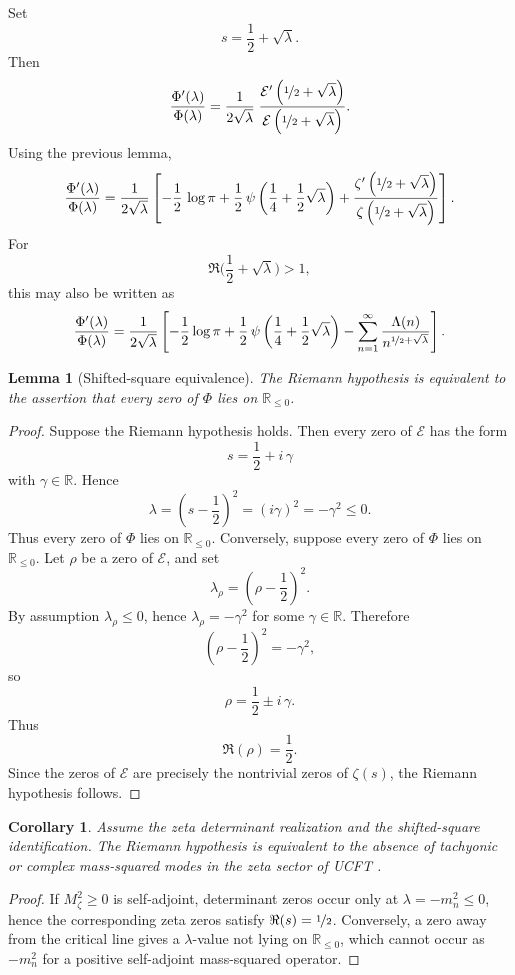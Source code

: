 \documentclass[pdflatex,sn-mathphys-num]{sn-jnl}
\theoremstyle{thmstyleone}
\newtheorem{lemma}{Lemma}
\newtheorem{corollary}{Corollary}
\theoremstyle{thmstyletwo}
\theoremstyle{thmstylethree}
\newcommand{\R}{\mathbb{R}}
\begin{document}
  \noindent Set
  \[
  s=\frac12+\sqrt{\lambda}.
  \]
  Then
  \[
  \frac{\Phi'(\lambda)}{\Phi(\lambda)}
  =
  \frac{1}{2\sqrt{\lambda}}\;
  \frac{\mathcal E'\left(\nicefrac12+\sqrt{\lambda}\right)}
  {\mathcal E\left(\nicefrac12+\sqrt{\lambda}\right)}.
  \]
  Using the previous lemma,
  \[
  \frac{\Phi'(\lambda)}{\Phi(\lambda)}
  =
  \frac{1}{2\sqrt{\lambda}}
  \left[
  -\frac12 \, \log\pi
  +
  \frac12 \, \psi\left(\frac14+\frac12\sqrt{\lambda}\right)
  +
  \frac{\zeta'\left(\nicefrac12+\sqrt{\lambda}\right)}
  {\zeta\left(\nicefrac12+\sqrt{\lambda}\right)}
  \right].
  \]
  For
  \[\Re\bigg(\frac12+\sqrt{\lambda}\bigg)>1,\]
  this may also be written as
  \[
  \frac{\Phi'(\lambda)}{\Phi(\lambda)}
  =
  \frac{1}{2\sqrt{\lambda}}
  \left[
  -\frac12\log\pi
  +
  \frac12 \,
    \psi\left(
      \frac14
      + \frac12\sqrt{\lambda}
    \right)
  -
  \sum_{n=1}^{\infty}
  \frac{
    \Lambda(n)
  }{
    n^{\nicefrac{1}{2}+\sqrt{\lambda}}
  }
  \right].
  \]

  \begin{lemma}[Shifted-square equivalence]
  The Riemann hypothesis \cite{Riemann1859,Edwards1974,Titchmarsh1986} is equivalent to the assertion that every zero of
  $\Phi$ lies on $\mathbb{R}_{\le0}$.
  \end{lemma}

  \begin{proof}
  Suppose the Riemann hypothesis holds.
  Then every zero of \(\mathcal{E}\) has the form
  \[
  s=\frac12+i\, \gamma
  \]
  with \(\gamma\in\mathbb R\). Hence
  \[
  \lambda=\left(s-\frac12\right)^2
  =
  (i\gamma)^2
  =
  -\gamma^2\le0.
  \]
  Thus every zero of \(\Phi\) lies on $\mathbb{R}_{\le0}$.
  Conversely, suppose every zero of \(\Phi\) lies on $\mathbb{R}_{\le0}$.
  Let \(\rho\) be a zero of \(\mathcal{E}\), and set
  \[
  \lambda_\rho=\left(\rho-\frac12\right)^2.
  \]
  By assumption $\lambda_\rho\le0$, hence $\lambda_\rho=-\gamma^2$
  for some \(\gamma\in\mathbb R\). Therefore
  \[
  \left(\rho-\frac12\right)^2=-\gamma^2,
  \]
  so
  \[
  \rho=\frac12\pm i\, \gamma.
  \]
  Thus
  \[
  \Re(\rho)=\frac12.
  \]
  Since the zeros of \(\mathcal{E}\) are precisely the nontrivial zeros of
  \(\zeta(s)\), the Riemann hypothesis follows.
  \end{proof}

  \begin{corollary}
  Assume the zeta determinant realization and the shifted-square identification.
  The Riemann hypothesis is equivalent to the absence of tachyonic or complex
  mass-squared modes in the zeta sector of UCFT \cite{Connes1999,BerryKeating1999}.
  \end{corollary}

  \begin{proof}
  If \(M_\zeta^2\ge0\) is self-adjoint, determinant zeros occur only at
  \(\lambda=-m_n^2\le0\), hence the corresponding zeta zeros satisfy
  \(\Re(s)=\nicefrac 12\).
  Conversely, a zero away from the critical line gives a \(\lambda\)-value not
  lying on $\R_{\le0}$, which cannot occur as \(-m_n^2\) for a positive
  self-adjoint mass-squared operator.
  \end{proof}

  
\end{document}
